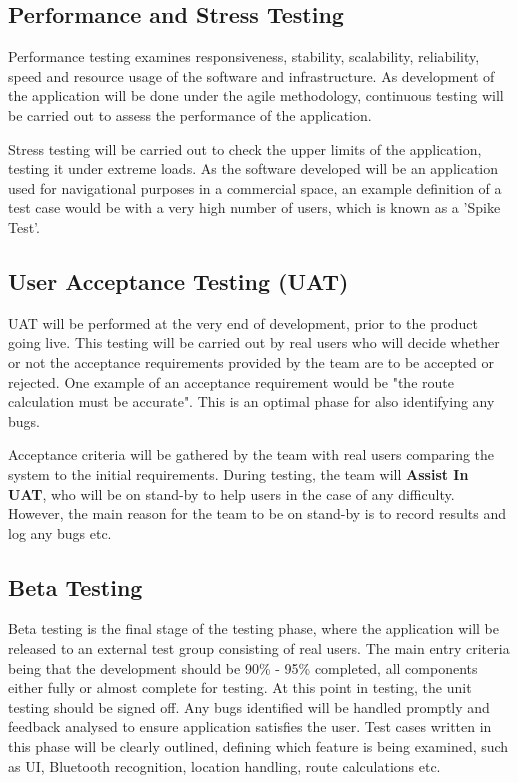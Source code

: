\subsection*{Performance and Stress Testing} %
Performance testing examines responsiveness, stability, scalability, reliability, speed and resource usage of the software and infrastructure. As development of the application will be done under the agile methodology, continuous testing will be carried out to assess the performance of the application.

Stress testing will be carried out to check the upper limits of the application, testing it under extreme loads. As the software developed will be an application used for navigational purposes in a commercial space, an example definition of a test case would be with a very high number of users, which is known as a 'Spike Test'.

\subsection*{User Acceptance Testing (UAT)} %
UAT will be performed at the very end of development, prior to the product going live. This testing will be carried out by real users who will decide whether or not the acceptance requirements provided by the team are to be accepted or rejected. One example of an acceptance requirement would be "the route calculation must be accurate". This is an optimal phase for also identifying any bugs.

Acceptance criteria will be gathered by the team with real users comparing the system to the initial requirements. During testing, the team will \textbf{Assist In UAT}, who will be on stand-by to help users in the case of any difficulty. However, the main reason for the team to be on stand-by is to record results and log any bugs etc.


\subsection*{Beta Testing}
Beta testing %
is the final stage of the testing phase, where the application will be released to an external test group consisting of real users. The main entry criteria being that the development should be 90\% - 95\% completed, all components either fully or almost complete for testing. At this point in testing, the unit testing should be signed off. Any bugs identified will be handled promptly and feedback analysed to ensure application satisfies the user. Test cases written in this phase will be clearly outlined, defining which feature is being examined, such as UI, Bluetooth recognition, location handling, route calculations etc.

